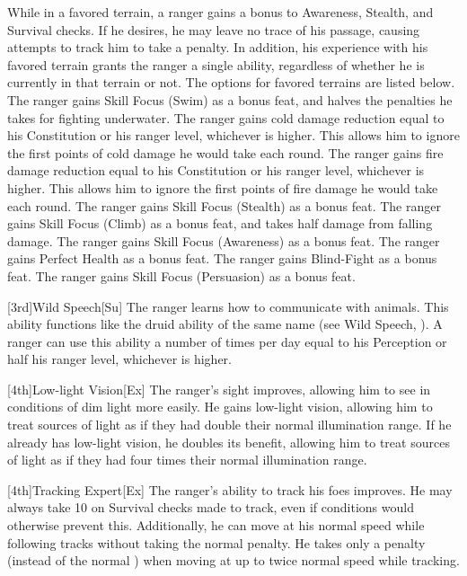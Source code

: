 \par While in a favored terrain, a ranger gains a  bonus to Awareness, Stealth, and Survival checks.
If he desires, he may leave no trace of his passage, causing attempts to track him to take a  penalty.
In addition, his experience with his favored terrain grants the ranger a single ability, regardless of whether he is currently in that terrain or not.
The options for favored terrains are listed below.
The ranger gains Skill Focus (Swim) as a bonus feat, and halves the penalties he takes for fighting underwater.
The ranger gains cold damage reduction equal to his Constitution or his ranger level, whichever is higher.
This allows him to ignore the first points of cold damage he would take each round.
The ranger gains fire damage reduction equal to his Constitution or his ranger level, whichever is higher.
This allows him to ignore the first points of fire damage he would take each round.
The ranger gains Skill Focus (Stealth) as a bonus feat.
The ranger gains Skill Focus (Climb) as a bonus feat, and takes half damage from falling damage.
The ranger gains Skill Focus (Awareness) as a bonus feat.
The ranger gains Perfect Health as a bonus feat.
The ranger gains Blind-Fight as a bonus feat.
The ranger gains Skill Focus (Persuasion) as a bonus feat.

[3rd]{Wild Speech}[Su]
The ranger learns how to communicate with animals.
This ability functions like the druid ability of the same name (see Wild Speech, ).
A ranger can use this ability a number of times per day equal to his Perception or half his ranger level, whichever is higher.

[4th]{Low-light Vision}[Ex]
The ranger's sight improves, allowing him to see in conditions of dim light more easily.
He gains low-light vision, allowing him to treat sources of light as if they had double their normal illumination range.
If he already has low-light vision, he doubles its benefit, allowing him to treat sources of light as if they had four times their normal illumination range.

[4th]{Tracking Expert}[Ex]
The ranger's ability to track his foes improves.
He may always take 10 on Survival checks made to track, even if conditions would otherwise prevent this.
Additionally, he can move at his normal speed while following tracks without taking the normal  penalty.
He takes only a  penalty (instead of the normal ) when moving at up to twice normal speed while tracking.

